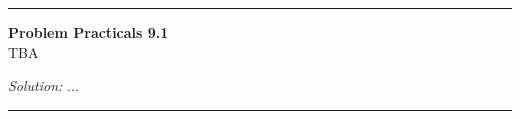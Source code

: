 \documentclass[a4paper, 11pt]{article}
\newenvironment{problem}[2][Problem]
    { \begin{mdframed}[backgroundcolor=gray!20] \textbf{#1 #2} \\}
    {  \end{mdframed}}
\newenvironment{solution}
    {\textit{Solution:}}
    {}
\begin{document}
\noindent\rule{7in}{2.8pt}

\begin{problem}{Practicals 9.1}
TBA
\end{problem}
\begin{solution}
...
\end{solution}

\noindent\rule{7in}{2.8pt}







% 
\end{document}
